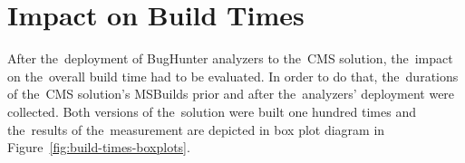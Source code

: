 \documentclass[
  digital, %
  table,   %
  lof,     %
  lot,     %
  oneside,
]{fithesis3}
\begin{document}
%
%
%
%

\section{Impact on Build Times}
\label{sec:build-times}
After the~deployment of BugHunter analyzers to the~CMS solution, the~impact on the~overall build time had to be evaluated. In order to do that, the~durations of the~CMS solution's MSBuilds prior and after the~analyzers' deployment were collected. Both versions of the~solution were built one hundred times and the~results of the~measurement are depicted in box plot diagram in Figure~\ref{fig:build-times-boxplots}.
\end{document}
